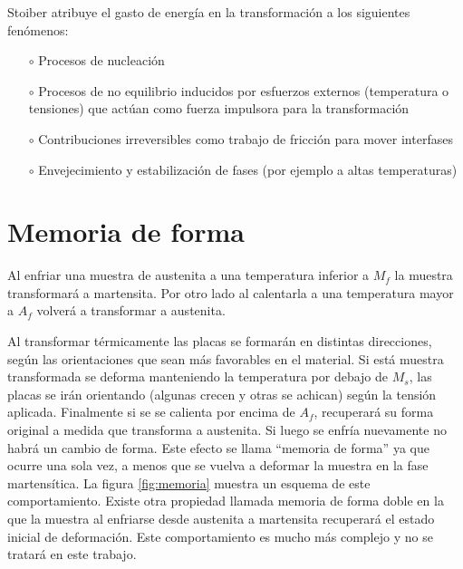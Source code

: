 \documentclass[a4paper,12pt,fleqn,twoside,openany]{book}
\begin{document}
 
Stoiber \cite{stoiber} atribuye el gasto de energía en la transformación a los siguientes fenómenos:
\begin{itemize}
 \item[$\circ$] Procesos de nucleación
 \item[$\circ$] Procesos de no equilibrio inducidos por esfuerzos externos (temperatura o tensiones) que actúan como fuerza impulsora para la 
 transformación
 \item[$\circ$] Contribuciones irreversibles como trabajo de fricción para mover interfases
 \item[$\circ$] Envejecimiento y estabilización de fases (por ejemplo a altas temperaturas) 
\end{itemize}



\section{Memoria de forma}

 Al enfriar una muestra de austenita a una temperatura inferior a $M_{f}$ la muestra transformará a martensita. Por otro lado al calentarla a una temperatura mayor a $A_{f}$ volverá a transformar a austenita. 
 
 Al transformar térmicamente las placas se formarán en distintas direcciones, según las orientaciones que sean más favorables en el material. Si está muestra transformada se deforma manteniendo la temperatura por debajo de $M_s$, las placas se irán orientando (algunas crecen y otras se achican) según la tensión aplicada. Finalmente si se se calienta por encima de $A_{f}$, recuperará su forma original a medida que transforma a austenita. Si luego se enfría nuevamente no habrá un cambio de forma. Este efecto se llama “memoria de forma” ya que ocurre una sola vez, a menos que se vuelva a deformar la muestra en la fase martensítica. La figura \ref{fig:memoria} muestra un esquema de este comportamiento. Existe otra propiedad llamada memoria de forma doble en la que la muestra al 
enfriarse desde austenita a martensita recuperará el estado inicial de deformación. Este comportamiento es mucho más complejo y no se tratará en este trabajo.
\end{document}
